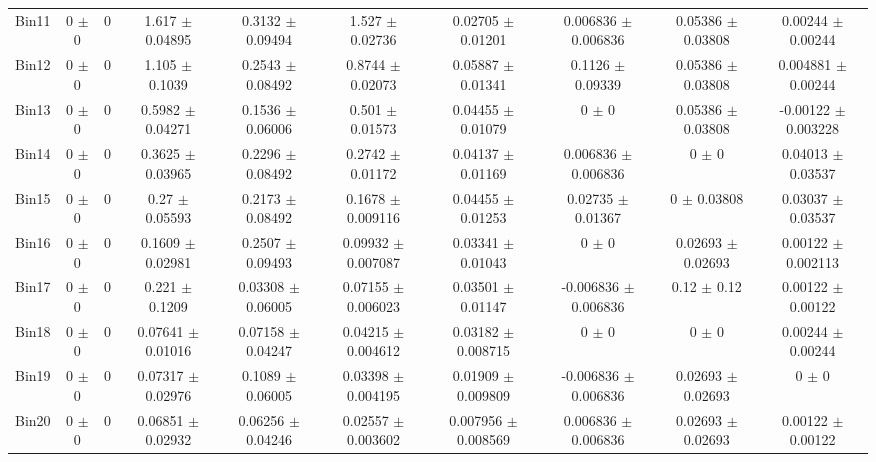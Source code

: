\begin{tabular}{@{\extracolsep{4pt}}lccccccccc@{}}
     Bin11 & 0 $\pm$ 0 & 0 & 1.617 $\pm$ 0.04895 & 0.3132 $\pm$ 0.09494 & 1.527 $\pm$ 0.02736 & 0.02705 $\pm$ 0.01201 & 0.006836 $\pm$ 0.006836 & 0.05386 $\pm$ 0.03808 & 0.00244 $\pm$ 0.00244 \\ 
     Bin12 & 0 $\pm$ 0 & 0 & 1.105 $\pm$ 0.1039 & 0.2543 $\pm$ 0.08492 & 0.8744 $\pm$ 0.02073 & 0.05887 $\pm$ 0.01341 & 0.1126 $\pm$ 0.09339 & 0.05386 $\pm$ 0.03808 & 0.004881 $\pm$ 0.00244 \\ 
     Bin13 & 0 $\pm$ 0 & 0 & 0.5982 $\pm$ 0.04271 & 0.1536 $\pm$ 0.06006 & 0.501 $\pm$ 0.01573 & 0.04455 $\pm$ 0.01079 & 0 $\pm$ 0 & 0.05386 $\pm$ 0.03808 & -0.00122 $\pm$ 0.003228 \\ 
     Bin14 & 0 $\pm$ 0 & 0 & 0.3625 $\pm$ 0.03965 & 0.2296 $\pm$ 0.08492 & 0.2742 $\pm$ 0.01172 & 0.04137 $\pm$ 0.01169 & 0.006836 $\pm$ 0.006836 & 0 $\pm$ 0 & 0.04013 $\pm$ 0.03537 \\ 
     Bin15 & 0 $\pm$ 0 & 0 & 0.27 $\pm$ 0.05593 & 0.2173 $\pm$ 0.08492 & 0.1678 $\pm$ 0.009116 & 0.04455 $\pm$ 0.01253 & 0.02735 $\pm$ 0.01367 & 0 $\pm$ 0.03808 & 0.03037 $\pm$ 0.03537 \\ 
     Bin16 & 0 $\pm$ 0 & 0 & 0.1609 $\pm$ 0.02981 & 0.2507 $\pm$ 0.09493 & 0.09932 $\pm$ 0.007087 & 0.03341 $\pm$ 0.01043 & 0 $\pm$ 0 & 0.02693 $\pm$ 0.02693 & 0.00122 $\pm$ 0.002113 \\ 
     Bin17 & 0 $\pm$ 0 & 0 & 0.221 $\pm$ 0.1209 & 0.03308 $\pm$ 0.06005 & 0.07155 $\pm$ 0.006023 & 0.03501 $\pm$ 0.01147 & -0.006836 $\pm$ 0.006836 & 0.12 $\pm$ 0.12 & 0.00122 $\pm$ 0.00122 \\ 
     Bin18 & 0 $\pm$ 0 & 0 & 0.07641 $\pm$ 0.01016 & 0.07158 $\pm$ 0.04247 & 0.04215 $\pm$ 0.004612 & 0.03182 $\pm$ 0.008715 & 0 $\pm$ 0 & 0 $\pm$ 0 & 0.00244 $\pm$ 0.00244 \\ 
     Bin19 & 0 $\pm$ 0 & 0 & 0.07317 $\pm$ 0.02976 & 0.1089 $\pm$ 0.06005 & 0.03398 $\pm$ 0.004195 & 0.01909 $\pm$ 0.009809 & -0.006836 $\pm$ 0.006836 & 0.02693 $\pm$ 0.02693 & 0 $\pm$ 0 \\ 
     Bin20 & 0 $\pm$ 0 & 0 & 0.06851 $\pm$ 0.02932 & 0.06256 $\pm$ 0.04246 & 0.02557 $\pm$ 0.003602 & 0.007956 $\pm$ 0.008569 & 0.006836 $\pm$ 0.006836 & 0.02693 $\pm$ 0.02693 & 0.00122 $\pm$ 0.00122 \\ 
\hline\hline
  \end{tabular}
